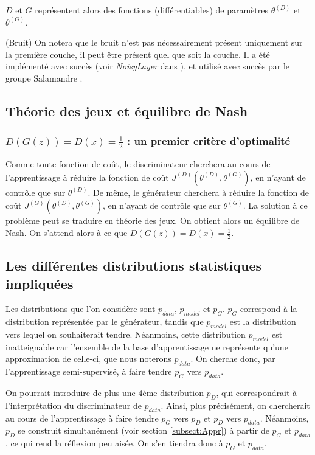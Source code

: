 $D$ et $G$ représentent alors des fonctions (différentiables) de paramètres $\theta^{(D)}$ et $\theta^{(G)}$.\\

\begin{remark}(Bruit)
On notera que le bruit n'est pas nécessairement présent uniquement sur la première couche, il peut être présent quel que soit la couche. Il a été implémenté avec succès (voir \textit{NoisyLayer} dans \cite{barrios_gan_2018}), et utilisé avec succès par le groupe Salamandre \cite{bouvier_dyvoire_dessine-moi_2018}.
\end{remark}
\subsection{Théorie des jeux et équilibre de Nash}
\subsubsection{$D(G(z)) = D(x) = \frac{1}{2}$ : un premier critère d'optimalité}
Comme toute fonction de coût, le discriminateur cherchera au cours de l'apprentissage à réduire la fonction de coût $J^{(D)}(\theta^{(D)}, \theta^{(G)})$, en n'ayant de contrôle que sur $\theta^{(D)}$. De même, le générateur cherchera à réduire la fonction de coût $J^{(G)}(\theta^{(D)}, \theta^{(G)})$, en n'ayant de contrôle que sur $\theta^{(G)}$. 
La solution à ce problème peut se traduire en théorie des jeux. On obtient alors un équilibre de Nash. On s'attend alors à ce que $D(G(z)) = D(x) = \frac{1}{2}$. 

\subsection{Les différentes distributions statistiques impliquées}
Les distributions que l'on considère sont $p_{data}$, $p_{model}$ et $p_{G}$. $p_{G}$ correspond à la distribution représentée par le générateur, tandis que $p_{model}$ est la distribution vers lequel on souhaiterait tendre. Néanmoins, cette distribution $p_{model}$ est inatteignable car l'ensemble de la base d'apprentissage ne représente qu'une approximation de celle-ci, que nous noterons $p_{data}$. On cherche donc, par l'apprentissage semi-supervisé, à faire tendre $p_{G}$ vers $p_{data}$. \\
\begin{remark}
On pourrait introduire de plus une 4ème distribution $p_{D}$, qui correspondrait à l'interprétation du discriminateur de $p_{data}$. Ainsi, plus précisément, on chercherait au cours de l'apprentissage à faire tendre $p_{G}$ vers $p_{D}$ et $p_{D}$ vers $p_{data}$. Néanmoins, $p_{D}$ se construit simultanément (voir section \ref{subsect:Appr}) à partir de $p_{G}$ et $p_{data}$, ce qui rend la réflexion peu aisée. On s'en tiendra donc à  $p_{G}$ et $p_{data}$.
\end{remark}
